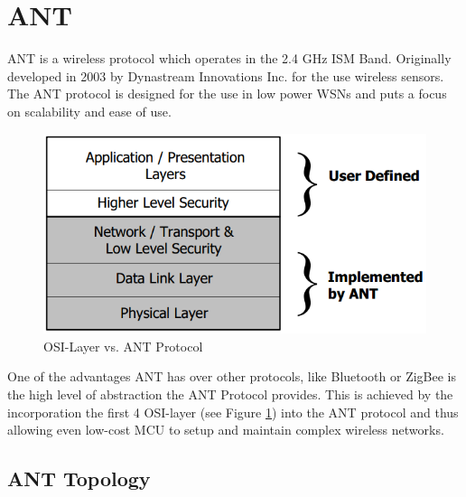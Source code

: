\section{ANT}
ANT \cite{DynastreamInnovationsInc.2013} is a wireless protocol which operates in the 2.4 GHz ISM Band. Originally developed in 2003 by Dynastream Innovations Inc. for the use wireless sensors. The ANT protocol is designed for the use in low power WSNs and puts a focus on scalability and ease of use.
\begin{figure}[h]
\centering
\includegraphics[scale=.5]{./pics/ANTstack.png}
\caption{OSI-Layer vs. ANT Protocol}\label{fig:osilayer}
\end{figure}
One of the advantages ANT has over other protocols, like Bluetooth or ZigBee is the high level of abstraction the ANT Protocol provides. This is achieved by the incorporation the first 4 OSI-layer (see Figure \ref{fig:osilayer}) into the ANT protocol and thus allowing even low-cost MCU to setup and maintain complex wireless networks.

\subsection{ANT Topology}

